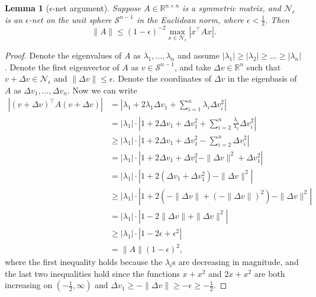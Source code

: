 \documentclass[11pt,notitlepage]{article}
\newcommand\Sc {\mathcal{S}}
\newcommand\Nc {\mathcal{N}}
\newcommand\R {\mathbb{R}}
\newtheorem{lemma}[theorem]{Lemma}
\begin{document}
\begin{lemma}[$\epsilon$-net argument]\label{lemma::norm_by_net}
  Suppose $A \in \R^{n\times n}$ is a symmetric matrix, and
  $\Nc_\epsilon$ is an $\epsilon$-net on the unit sphere $\Sc^{n-1}$ in
  the Euclidean norm, where $\epsilon < \frac12$. Then
    \[
      \|A\| \leq (1 - \epsilon)^{-2} \max_{x \in \Nc_\epsilon} |x^\top Ax|.
    \]
\end{lemma}
\begin{proof}
  Denote the eigenvalues of $A$ as $\lambda_1, \dots, \lambda_n$
  and assume $|\lambda_1| \geq |\lambda_2| \geq \dots \geq |\lambda_n|$.
  Denote the first eigenvector of $A$ as $v \in \Sc^{n-1}$, and take
  $\Delta v \in \R^n$ such that $v + \Delta v \in \Nc_\epsilon$ and
  $\|\Delta v\| \leq \epsilon.$ 
  Denote the coordinates of $\Delta v$ in
  the eigenbasis of $A$ as $\Delta v_1, \dots, \Delta v_n$.
  Now we can write
    \begin{align*}
      \left|(v + \Delta v)^\top  A (v + \Delta v)\right|
        &= \left|\lambda_1 + 2\lambda_1\Delta v_1
          + \sum_{i=1}^n \lambda_i \Delta v_i^2\right|\\
        &= |\lambda_1|\cdot \left|1 + 2\Delta v_1 + \Delta v_1^2
          + \sum_{i=2}^n \frac{\lambda_i}{\lambda_1} \Delta v_i^2\right|\\
        &\geq|\lambda_1|\cdot \left|1 + 2\Delta v_1 + \Delta v_1^2
          - \sum_{i=2}^n \Delta v_i^2\right|\\
        &= |\lambda_1|\cdot \left|1 + 2\Delta v_1 + \Delta v_1^2 - \|\Delta v\|^2 + \Delta v_1^2\right|\\
        &= |\lambda_1|\cdot \left|1 + 2\left(\Delta v_1 + \Delta v_1^2\right) - \|\Delta v\|^2 \right|\\
        &\ge |\lambda_1|\cdot \left|1 + 2\left(-\|\Delta v\| + (-\|\Delta v\|)^2\right) - \|\Delta v\|^2 \right|\\
        &=|\lambda_1|\cdot \left|1 - 2\|\Delta v\| + \|\Delta v\|^2 \right|\\
        &\geq |\lambda_1| \cdot |1 - 2\epsilon + \epsilon^2|\\
        &= \|A\|(1-\epsilon)^2,
    \end{align*}
  where the first inequality holds because the $\lambda_i$s are
  decreasing in magnitude, and the last two inequalities hold since
  the functions $x + x^2$ and $2x + x^2$ are both increasing on
  $(-\frac12, \infty)$ and $\Delta v_1 \geq -\|\Delta v\| \geq
  -\epsilon \geq -\frac12$.
\end{proof}
\end{document}
